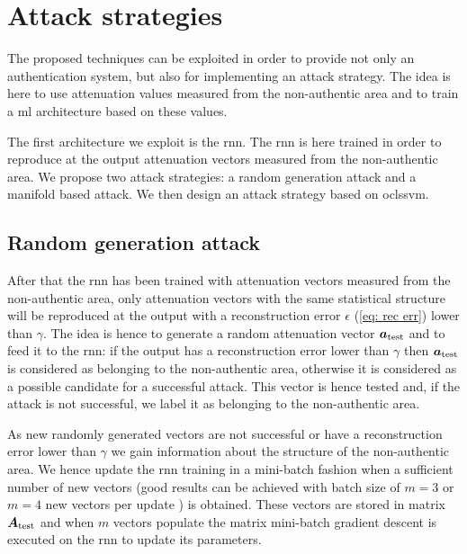 \documentclass[draftcls,onecolumn,12pt]{IEEEtran}
\begin{document}

\section{Attack strategies}
\label{sec:attack}
The proposed techniques can be exploited in order to provide not only an authentication system, but also for implementing an attack strategy. The idea is here to use attenuation values measured from the non-authentic area and to train a \ac{ml} architecture based on these values.

The first architecture we exploit is the \ac{rnn}. The \ac{rnn} is here trained in order to reproduce at the output attenuation vectors measured from the non-authentic area. We propose two attack strategies: a random generation attack and a manifold based attack. We then design an attack strategy based on \ac{oclssvm}.

\subsection{Random generation attack}
After that the \ac{rnn} has been trained with attenuation vectors measured from the non-authentic area, only attenuation vectors with the same statistical structure will be reproduced at the output with a reconstruction error $\epsilon$ (\ref{eq: rec err}) lower than $\gamma$. The idea is hence to generate a random attenuation vector $\bm{a}_{\rm test}$ and to feed it to the \ac{rnn}: if the output has a reconstruction error lower than $\gamma$ then $\bm{a}_{\rm test}$ is considered as belonging to the non-authentic area, otherwise it is considered as a possible candidate for a successful attack. This vector is hence tested and, if the attack is not successful, we label it as belonging to the non-authentic area.

As new randomly generated vectors are not successful or have a reconstruction error lower than $\gamma$ we gain information about the structure of the non-authentic area. We hence update the \ac{rnn} training in a mini-batch fashion when a sufficient number of new vectors (good results can be achieved with batch size of $m=3$ or $m=4$ new vectors per update \cite{bengio-12}) is obtained. These vectors are stored in matrix $\bm{A}_{\rm test}$ and when $m$ vectors populate the matrix mini-batch gradient descent is executed on the \ac{rnn} to update its parameters.
\end{document}
